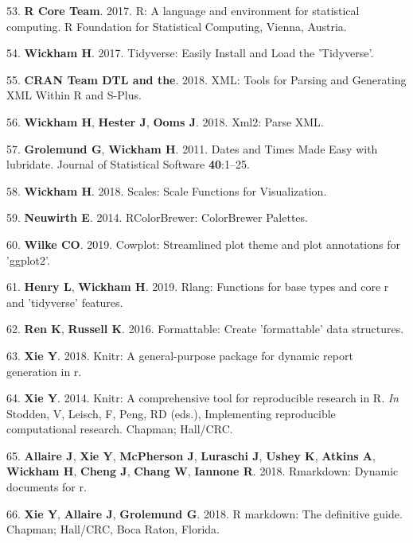 \documentclass[11pt,]{article}
\begin{document}
\hypertarget{ref-R_software_2017}{}
53. \textbf{R Core Team}. 2017. R: A language and environment for
statistical computing. R Foundation for Statistical Computing, Vienna,
Austria.

\hypertarget{ref-wickham_tidyverse_2017}{}
54. \textbf{Wickham H}. 2017. Tidyverse: Easily Install and Load the
'Tidyverse'.

\hypertarget{ref-duncan_xml_2018}{}
55. \textbf{CRAN Team DTL and the}. 2018. XML: Tools for Parsing and
Generating XML Within R and S-Plus.

\hypertarget{ref-wickham_xml2_2018}{}
56. \textbf{Wickham H}, \textbf{Hester J}, \textbf{Ooms J}. 2018. Xml2:
Parse XML.

\hypertarget{ref-grolemund_dates_2011}{}
57. \textbf{Grolemund G}, \textbf{Wickham H}. 2011. Dates and Times Made
Easy with lubridate. Journal of Statistical Software \textbf{40}:1--25.

\hypertarget{ref-wickham_scales_2018}{}
58. \textbf{Wickham H}. 2018. Scales: Scale Functions for Visualization.

\hypertarget{ref-neuwirth_rcolorbrewer_2014}{}
59. \textbf{Neuwirth E}. 2014. RColorBrewer: ColorBrewer Palettes.

\hypertarget{ref-cowplot}{}
60. \textbf{Wilke CO}. 2019. Cowplot: Streamlined plot theme and plot
annotations for 'ggplot2'.

\hypertarget{ref-rlang}{}
61. \textbf{Henry L}, \textbf{Wickham H}. 2019. Rlang: Functions for
base types and core r and 'tidyverse' features.

\hypertarget{ref-formattable}{}
62. \textbf{Ren K}, \textbf{Russell K}. 2016. Formattable: Create
'formattable' data structures.

\hypertarget{ref-knitr_2018}{}
63. \textbf{Xie Y}. 2018. Knitr: A general-purpose package for dynamic
report generation in r.

\hypertarget{ref-knitr_2014}{}
64. \textbf{Xie Y}. 2014. Knitr: A comprehensive tool for reproducible
research in R. \emph{In} Stodden, V, Leisch, F, Peng, RD (eds.),
Implementing reproducible computational research. Chapman; Hall/CRC.

\hypertarget{ref-rmd_rstudio}{}
65. \textbf{Allaire J}, \textbf{Xie Y}, \textbf{McPherson J},
\textbf{Luraschi J}, \textbf{Ushey K}, \textbf{Atkins A},
\textbf{Wickham H}, \textbf{Cheng J}, \textbf{Chang W}, \textbf{Iannone
R}. 2018. Rmarkdown: Dynamic documents for r.

\hypertarget{ref-rmd_book}{}
66. \textbf{Xie Y}, \textbf{Allaire J}, \textbf{Grolemund G}. 2018. R
markdown: The definitive guide. Chapman; Hall/CRC, Boca Raton, Florida.
\end{document}
